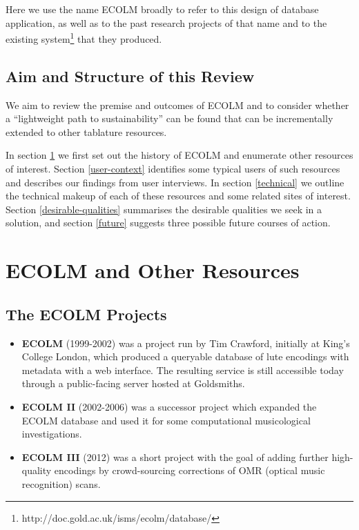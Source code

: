 \documentclass[sigconf, nonacm=true]{acmart}
\begin{document}
\begin{sloppypar}
  Here we use the name ECOLM broadly to refer to this design of
  database application, as well as to the past research projects of
  that name and to the existing
  system\footnote{http://doc.gold.ac.uk/isms/ecolm/database/} that
  they produced.

  \subsection{Aim and Structure of this Review}

  We aim to review the premise and outcomes of ECOLM and to consider
  whether a ``lightweight path to sustainability'' can be found that
  can be incrementally extended to other tablature resources.

  In section \ref{enumerate-resources} we first set out the history of
  ECOLM and enumerate other resources of interest. Section
  \ref{user-context} identifies some typical users of such resources
  and describes our findings from user interviews. In section
  \ref{technical} we outline the technical makeup of each of these
  resources and some related sites of interest. Section
  \ref{desirable-qualities} summarises the desirable qualities we seek
  in a solution, and section \ref{future} suggests three possible
  future courses of action.

  \section{ECOLM and Other Resources}\label{enumerate-resources}
  
  \subsection{The ECOLM Projects}

  \begin{itemize}
  \item {\bf ECOLM} (1999-2002) was a project run by Tim Crawford,
    initially at King's College London, which produced a queryable
    database of lute encodings with metadata with a web interface. The
    resulting service is still accessible today through a
    public-facing server hosted at Goldsmiths.
  \item {\bf ECOLM II} (2002-2006) was a successor project which
    expanded the ECOLM database and used it for some computational
    musicological investigations.
  \item {\bf ECOLM III} (2012) was a short project with the goal of
    adding further high-quality encodings by crowd-sourcing
    corrections of OMR (optical music recognition) scans.
  \end{itemize}


\end{sloppypar}
\end{document}
